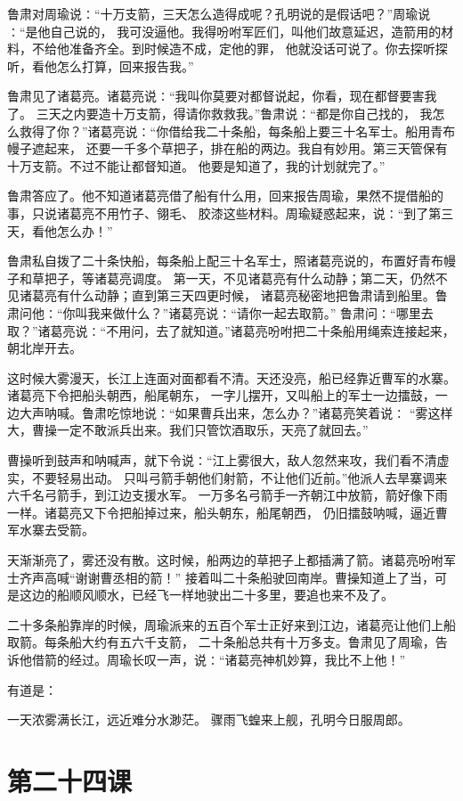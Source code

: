 \documentclass[12pt,UTF8]{ctexbook}
\begin{document}
鲁肃对周瑜说∶“十万支箭，三天怎么造得成呢？孔明说的是假话吧？”周瑜说∶“是他自己说的，
我可没逼他。我得吩咐军匠们，叫他们故意延迟，造箭用的材料，不给他准备齐全。到时候造不成，定他的罪，
他就没话可说了。你去探听探听，看他怎么打算，回来报告我。”

鲁肃见了诸葛亮。诸葛亮说∶“我叫你莫要对都督说起，你看，现在都督要害我了。
三天之内要造十万支箭，得请你救救我。”鲁肃说∶“都是你自己找的，
我怎么救得了你？”诸葛亮说∶“你借给我二十条船，每条船上要三十名军士。船用青布幔子遮起来，
还要一千多个草把子，排在船的两边。我自有妙用。第三天管保有十万支箭。不过不能让都督知道。
他要是知道了，我的计划就完了。”

鲁肃答应了。他不知道诸葛亮借了船有什么用，回来报告周瑜，果然不提借船的事，只说诸葛亮不用竹子、翎毛、
胶漆这些材料。周瑜疑惑起来，说∶“到了第三天，看他怎么办！”

鲁肃私自拨了二十条快船，每条船上配三十名军士，照诸葛亮说的，布置好青布幔子和草把子，等诸葛亮调度。
第一天，不见诸葛亮有什么动静；第二天，仍然不见诸葛亮有什么动静；直到第三天四更时候，
诸葛亮秘密地把鲁肃请到船里。鲁肃问他∶“你叫我来做什么？”诸葛亮说∶“请你一起去取箭。”
鲁肃问∶“哪里去取？”诸葛亮说∶“不用问，去了就知道。”诸葛亮吩咐把二十条船用绳索连接起来，朝北岸开去。

这时候大雾漫天，长江上连面对面都看不清。天还没亮，船已经靠近曹军的水寨。诸葛亮下令把船头朝西，船尾朝东，
一字儿摆开，又叫船上的军士一边擂鼓，一边大声呐喊。鲁肃吃惊地说∶“如果曹兵出来，怎么办？”诸葛亮笑着说∶
“雾这样大，曹操一定不敢派兵出来。我们只管饮酒取乐，天亮了就回去。”

曹操听到鼓声和呐喊声，就下令说∶“江上雾很大，敌人忽然来攻，我们看不清虚实，不要轻易出动。
只叫弓箭手朝他们射箭，不让他们近前。”他派人去旱寨调来六千名弓箭手，到江边支援水军。
一万多名弓箭手一齐朝江中放箭，箭好像下雨一样。诸葛亮又下令把船掉过来，船头朝东，船尾朝西，
仍旧擂鼓呐喊，逼近曹军水寨去受箭。

天渐渐亮了，雾还没有散。这时候，船两边的草把子上都插满了箭。诸葛亮吩咐军士齐声高喊“谢谢曹丞相的箭！”
接着叫二十条船驶回南岸。曹操知道上了当，可是这边的船顺风顺水，已经飞一样地驶出二十多里，要追也来不及了。

二十多条船靠岸的时候，周瑜派来的五百个军士正好来到江边，诸葛亮让他们上船取箭。每条船大约有五六千支箭，
二十条船总共有十万多支。鲁肃见了周瑜，告诉他借箭的经过。周瑜长叹一声，说∶“诸葛亮神机妙算，我比不上他！”

有道是：

一天浓雾满长江，远近难分水渺茫。
骤雨飞蝗来上舰，孔明今日服周郎。

\section{第二十四课}
\end{document}

